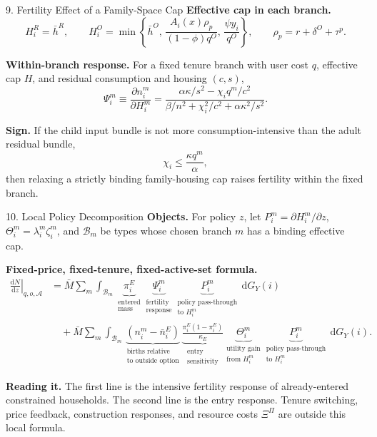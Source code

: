 \documentclass[11pt,aspectratio=169]{beamer}
\newcommand{\dd}{\mathrm d}
\newcommand{\1}{\mathbf 1}
\newcommand{\Mbar}{\bar M}
\begin{document}
\begin{frame}{9. Fertility Effect of a Family-Space Cap}
\footnotesize
\textbf{Effective cap in each branch.}
\[
H_i^R=\bar h^R,\qquad
H_i^O=\min\left\{
\bar h^O,\,
\frac{A_i(x)\rho_p}{(1-\phi)q^O},\,
\frac{\psi y_i}{q^O}
\right\},
\qquad
\rho_p=r+\delta^O+\tau^p.
\]

\smallskip
\textbf{Within-branch response.}
For a fixed tenure branch with user cost \(q\), effective cap \(H\), and residual consumption and housing \((c,s)\),
\[
\Psi_i^m
\equiv
\frac{\partial n_i^m}{\partial H_i^m}
=
\frac{\alpha\kappa/s^2-\chi_i q^m/c^2}
{\beta/n^2+\chi_i^2/c^2+\alpha\kappa^2/s^2}.
\]

\smallskip
\textbf{Sign.}
If the child input bundle is not more consumption-intensive than the adult residual bundle,
\[
\chi_i\le \frac{\kappa q^m}{\alpha},
\]
then relaxing a strictly binding family-housing cap raises fertility within the fixed branch.
\end{frame}

\begin{frame}{10. Local Policy Decomposition}
\scriptsize
\textbf{Objects.}
For policy \(z\), let \(P_i^m=\partial H_i^m/\partial z\), \(\Theta_i^m=\lambda_i^m\zeta_i^m\), and \(\mathcal B_m\) be types whose chosen branch \(m\) has a binding effective cap.

\smallskip
\textbf{Fixed-price, fixed-tenure, fixed-active-set formula.}
\[
\begin{aligned}
\left.\frac{\dd N}{\dd z}\right|_{q,o,\mathcal A}
&=
\Mbar\sum_m\int_{\mathcal B_m}
\underbrace{\pi_i^E}_{\substack{\text{entered}\\ \text{mass}}}
\underbrace{\Psi_i^m}_{\substack{\text{fertility}\\ \text{response}}}
\underbrace{P_i^m}_{\substack{\text{policy pass-through}\\ \text{to }H_i^m}}
\,\dd G_Y(i)
\\
&\quad+
\Mbar\sum_m\int_{\mathcal B_m}
\underbrace{(n_i^m-\bar n_i^E)}_{\substack{\text{births relative}\\ \text{to outside option}}}
\underbrace{\frac{\pi_i^E(1-\pi_i^E)}{\kappa_E}}_{\substack{\text{entry}\\ \text{sensitivity}}}
\underbrace{\Theta_i^m}_{\substack{\text{utility gain}\\ \text{from }H_i^m}}
\underbrace{P_i^m}_{\substack{\text{policy pass-through}\\ \text{to }H_i^m}}
\,\dd G_Y(i).
\end{aligned}
\]

\smallskip
\textbf{Reading it.}
The first line is the intensive fertility response of already-entered constrained households. The second line is the entry response. Tenure switching, price feedback, construction responses, and resource costs \(\Xi^\Pi\) are outside this local formula.
\end{frame}
\end{document}
